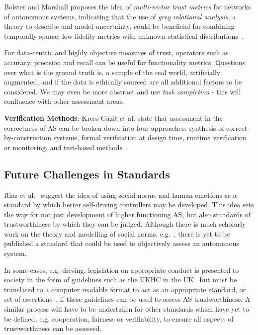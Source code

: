 Bolster and Marshall proposes the idea of \emph{multi-vector trust metrics} for networks of autonomous systems, indicating that the use of \emph{grey relational analysis}, a theory to describe and model uncertainty, could be beneficial for combining temporally sparse, low fidelity metrics with unknown statistical distributions~\cite{Bolster2014}. 

For data-centric and highly objective measures of trust, operators such as accuracy, precision and recall can be useful for functionality metrics. Questions over what is the ground truth is, a sample of the real world, artificially augmented, and if the data is ethically sourced are all additional factors to be considered. We may even be more abstract and use \emph{task completion} - this will confluence with other assessment areas.





\noindent\textbf{Verification Methods}: %
Kress-Gazit et al. state that assessment in the correctness of AS can be broken down into four approaches: synthesis of correct-by-construction systems, formal verification at design time, runtime verification or monitoring, and test-based methods~\cite{kress2021formalizing}. 








\subsection{Future Challenges in Standards}

Riaz et al.~\cite{Riaz2018} suggest the idea of using social norms and human emotions as a standard by which better self-driving controllers may be developed. This idea sets the way for not just development of higher functioning AS, but also standards of trustworthiness by which they can be judged. Although there is much scholarly work on the theory and modelling of social norms, e.g.~\cite{hechter2001social}, there is yet to be published a standard that could be used to objectively assess an autonomous system. 

In some cases, e.g. driving, legislation on appropriate conduct is presented to society in the form of guidelines such as the UKHC in the UK~\cite{highwayCode} but must be translated to a computer readable format to act as an appropriate standard, or set of assertions~\cite{harper2021safety}, if these guidelines can be used to assess AS trustworthiness. A similar process will have to be undertaken for other standards which have yet to be defined, e.g. cooperation, fairness or verifiability, to ensure all aspects of trustworthiness can be assessed. 


